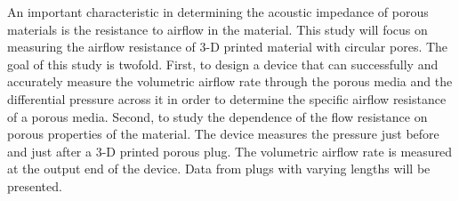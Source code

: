 	An important characteristic in determining the acoustic impedance of porous materials is 
the resistance to airflow in the material. This study will focus on measuring the airflow 
resistance of 3-D printed material with circular pores. The goal of this study is twofold. First, 
to design a device that can successfully and accurately measure the volumetric airflow rate through 
the porous media and the differential pressure across it in order to determine the specific airflow 
resistance of a porous media. Second, to study the dependence of the flow resistance on porous 
properties of the material. The device measures the pressure just before and just after a 3-D 
printed porous plug. The volumetric airflow rate is measured at the output end of the device. Data 
from plugs with varying lengths will be presented. 
